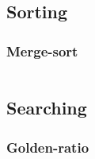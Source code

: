 \subsection{Sorting}

\subsubsection{Merge-sort}
\inputminted{cpp}{../code/sort&search/merge_sort.cpp}


\subsection{Searching}

\subsubsection{Golden-ratio}
\inputminted{cpp}{../code/sort&search/golden_ratio.cpp}